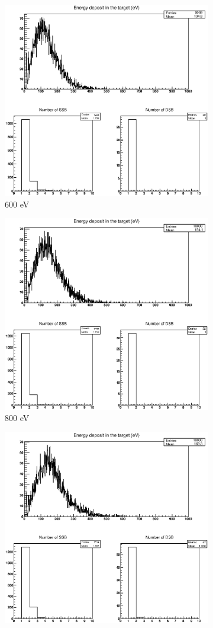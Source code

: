 \begin{figure}
\begin{subfigure}{.5\textwidth}
  \includegraphics[width=.78\linewidth]{./Figures/1zbbp600ev.eps}
  \caption{600 eV}
  \label{fig:sub3}
\end{subfigure}%
\begin{subfigure}{.5\textwidth}
  \centering
  \includegraphics[width=.78\linewidth]{./Figures/1zbbp800ev.eps}
  \caption{800 eV}
  \label{fig:sub4}
\end{subfigure}
\begin{subfigure}{.5\textwidth}
  \centering
  \includegraphics[width=.78\linewidth]{./Figures/1zbbp1kev.eps}

\end{subfigure}
\end{figure}
